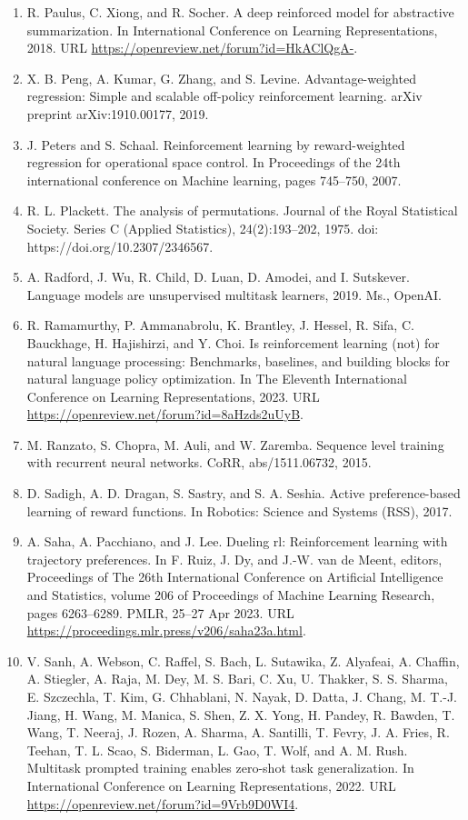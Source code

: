 \documentclass[11pt,UTF8,fontset=fandol]{ctexart}
\begin{document}
\begin{enumerate}[leftmargin=2.2em, itemsep=2pt]
\item R. Paulus, C. Xiong, and R. Socher. A deep reinforced model for abstractive summarization. In International Conference on Learning Representations, 2018. URL \url{https://openreview.net/forum?id=HkAClQgA-}.
\item X. B. Peng, A. Kumar, G. Zhang, and S. Levine. Advantage-weighted regression: Simple and scalable off-policy reinforcement learning. arXiv preprint arXiv:1910.00177, 2019.
\item J. Peters and S. Schaal. Reinforcement learning by reward-weighted regression for operational space control. In Proceedings of the 24th international conference on Machine learning, pages 745--750, 2007.
\item R. L. Plackett. The analysis of permutations. Journal of the Royal Statistical Society. Series C (Applied Statistics), 24(2):193--202, 1975. doi: https://doi.org/10.2307/2346567.
\item A. Radford, J. Wu, R. Child, D. Luan, D. Amodei, and I. Sutskever. Language models are unsupervised multitask learners, 2019. Ms., OpenAI.
\item R. Ramamurthy, P. Ammanabrolu, K. Brantley, J. Hessel, R. Sifa, C. Bauckhage, H. Hajishirzi, and Y. Choi. Is reinforcement learning (not) for natural language processing: Benchmarks, baselines, and building blocks for natural language policy optimization. In The Eleventh International Conference on Learning Representations, 2023. URL \url{https://openreview.net/forum?id=8aHzds2uUyB}.
\item M. Ranzato, S. Chopra, M. Auli, and W. Zaremba. Sequence level training with recurrent neural networks. CoRR, abs/1511.06732, 2015.
\item D. Sadigh, A. D. Dragan, S. Sastry, and S. A. Seshia. Active preference-based learning of reward functions. In Robotics: Science and Systems (RSS), 2017.
\item A. Saha, A. Pacchiano, and J. Lee. Dueling rl: Reinforcement learning with trajectory preferences. In F. Ruiz, J. Dy, and J.-W. van de Meent, editors, Proceedings of The 26th International Conference on Artificial Intelligence and Statistics, volume 206 of Proceedings of Machine Learning Research, pages 6263--6289. PMLR, 25--27 Apr 2023. URL \url{https://proceedings.mlr.press/v206/saha23a.html}.
\item V. Sanh, A. Webson, C. Raffel, S. Bach, L. Sutawika, Z. Alyafeai, A. Chaffin, A. Stiegler, A. Raja, M. Dey, M. S. Bari, C. Xu, U. Thakker, S. S. Sharma, E. Szczechla, T. Kim, G. Chhablani, N. Nayak, D. Datta, J. Chang, M. T.-J. Jiang, H. Wang, M. Manica, S. Shen, Z. X. Yong, H. Pandey, R. Bawden, T. Wang, T. Neeraj, J. Rozen, A. Sharma, A. Santilli, T. Fevry, J. A. Fries, R. Teehan, T. L. Scao, S. Biderman, L. Gao, T. Wolf, and A. M. Rush. Multitask prompted training enables zero-shot task generalization. In International Conference on Learning Representations, 2022. URL \url{https://openreview.net/forum?id=9Vrb9D0WI4}.

\end{enumerate}
\end{document}
